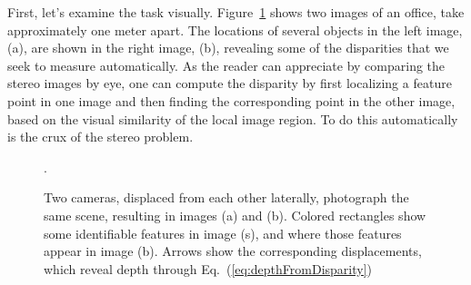 First, let's examine the task visually.   Figure~\ref{fig:stereomatch} shows two images of an office, take approximately one meter apart.  The locations of several objects in the left image, (a), are shown in the right image, (b), revealing some of the disparities that we seek to measure automatically.  As the reader can appreciate by comparing the stereo images by eye, one can compute the disparity by first localizing a feature point in one image and then finding the corresponding point in the other image, based on the visual similarity of the local image region.  To do this automatically is the crux of the stereo problem.


\begin{figure}
    \centerline{
    }
    \caption{Two cameras, displaced from each other laterally, photograph the same scene, resulting in images (a) and (b).  Colored rectangles show some identifiable features in image (s), and where those features appear in image (b).  Arrows show the corresponding displacements, which reveal depth through Eq.~(\ref{eq:depthFromDisparity})}.
    \label{fig:stereomatch}
\end{figure}


